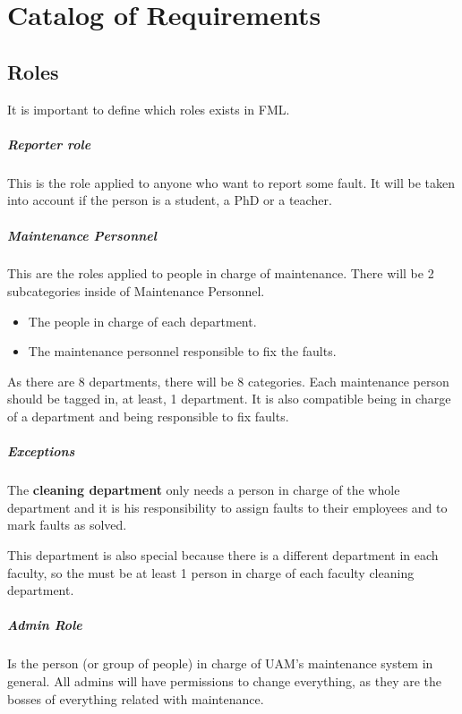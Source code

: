 \chapter{Catalog of Requirements}
\label{chapRequirements}
\section{Roles}
It is important to define which roles exists in FML.

\paragraph{Reporter role} \label{ReporterRole} This is the role applied to anyone who want to report some fault. It will be taken into account if the person is a student, a PhD or a teacher.

\paragraph{Maintenance Personnel} \label{MaintenancePersonnel}

This are the roles applied to people in charge of maintenance. There will be 2 subcategories inside of Maintenance Personnel.

\begin{itemize}
\item The people in charge of each department.
\item The maintenance personnel responsible to fix the faults.
\end{itemize}

As there are 8 departments, there will be 8 categories. Each maintenance person should be tagged in, at least, 1 department. It is also compatible being in charge of a department and being responsible to fix faults.

\paragraph{Exceptions} The \textbf{cleaning department} only needs a person in charge of the whole department and it is his responsibility to assign faults to their employees and to mark faults as solved.

This department is also special because there is a different department in each faculty, so the must be at least 1 person in charge of each faculty cleaning department.

\paragraph{Admin Role} Is the person (or group of people) in charge of UAM's maintenance system in general. All admins will have permissions to change everything, as they are the bosses of everything related with maintenance.

